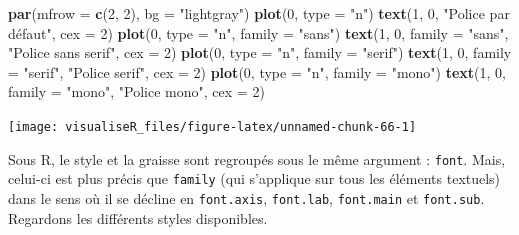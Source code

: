 \documentclass[]{article}
\newenvironment{Shaded}{\begin{snugshade}}{\end{snugshade}}
\newcommand{\DataTypeTok}[1]{\textcolor[rgb]{0.13,0.29,0.53}{#1}}
\newcommand{\DecValTok}[1]{\textcolor[rgb]{0.00,0.00,0.81}{#1}}
\newcommand{\KeywordTok}[1]{\textcolor[rgb]{0.13,0.29,0.53}{\textbf{#1}}}
\newcommand{\NormalTok}[1]{#1}
\newcommand{\StringTok}[1]{\textcolor[rgb]{0.31,0.60,0.02}{#1}}
\begin{document}
\begin{Shaded}
\begin{Highlighting}[]
\KeywordTok{par}\NormalTok{(}\DataTypeTok{mfrow =} \KeywordTok{c}\NormalTok{(}\DecValTok{2}\NormalTok{, }\DecValTok{2}\NormalTok{), }\DataTypeTok{bg =} \StringTok{"lightgray"}\NormalTok{)}
\KeywordTok{plot}\NormalTok{(}\DecValTok{0}\NormalTok{, }\DataTypeTok{type =} \StringTok{"n"}\NormalTok{)}
\KeywordTok{text}\NormalTok{(}\DecValTok{1}\NormalTok{, }\DecValTok{0}\NormalTok{, }\StringTok{"Police par défaut"}\NormalTok{, }\DataTypeTok{cex =} \DecValTok{2}\NormalTok{)}
\KeywordTok{plot}\NormalTok{(}\DecValTok{0}\NormalTok{, }\DataTypeTok{type =} \StringTok{"n"}\NormalTok{, }\DataTypeTok{family =} \StringTok{"sans"}\NormalTok{)}
\KeywordTok{text}\NormalTok{(}\DecValTok{1}\NormalTok{, }\DecValTok{0}\NormalTok{, }\DataTypeTok{family =} \StringTok{"sans"}\NormalTok{, }\StringTok{"Police sans serif"}\NormalTok{, }\DataTypeTok{cex =} \DecValTok{2}\NormalTok{)}
\KeywordTok{plot}\NormalTok{(}\DecValTok{0}\NormalTok{, }\DataTypeTok{type =} \StringTok{"n"}\NormalTok{, }\DataTypeTok{family =} \StringTok{"serif"}\NormalTok{)}
\KeywordTok{text}\NormalTok{(}\DecValTok{1}\NormalTok{, }\DecValTok{0}\NormalTok{, }\DataTypeTok{family =} \StringTok{"serif"}\NormalTok{, }\StringTok{"Police serif"}\NormalTok{, }\DataTypeTok{cex =} \DecValTok{2}\NormalTok{)}
\KeywordTok{plot}\NormalTok{(}\DecValTok{0}\NormalTok{, }\DataTypeTok{type =} \StringTok{"n"}\NormalTok{, }\DataTypeTok{family =} \StringTok{"mono"}\NormalTok{)}
\KeywordTok{text}\NormalTok{(}\DecValTok{1}\NormalTok{, }\DecValTok{0}\NormalTok{, }\DataTypeTok{family =} \StringTok{"mono"}\NormalTok{, }\StringTok{"Police mono"}\NormalTok{, }\DataTypeTok{cex =} \DecValTok{2}\NormalTok{)}
\end{Highlighting}
\end{Shaded}

\begin{center}\texttt{[image: visualiseR\_files/figure-latex/unnamed-chunk-66-1]} \end{center}

Sous R, le style et la graisse sont regroupés sous le même argument : \texttt{font}. Mais, celui-ci est plus précis que \texttt{family} (qui s'applique sur tous les éléments textuels) dans le sens où il se décline en \texttt{font.axis}, \texttt{font.lab}, \texttt{font.main} et \texttt{font.sub}. Regardons les différents styles disponibles.
\end{document}

